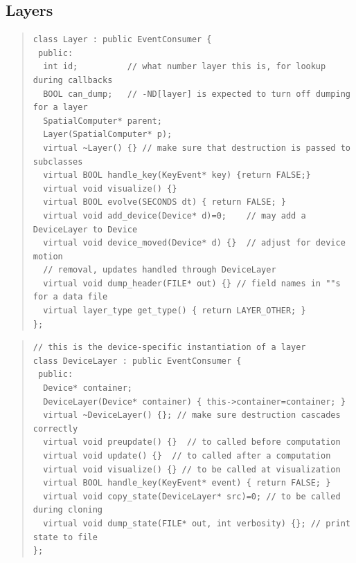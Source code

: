 \documentclass{article}
\begin{document}
\subsection{Layers}

\begin{quote}
\begin{verbatim}
class Layer : public EventConsumer {
 public:
  int id;          // what number layer this is, for lookup during callbacks                    
  BOOL can_dump;   // -ND[layer] is expected to turn off dumping for a layer                    
  SpatialComputer* parent;
  Layer(SpatialComputer* p);
  virtual ~Layer() {} // make sure that destruction is passed to subclasses                     
  virtual BOOL handle_key(KeyEvent* key) {return FALSE;}
  virtual void visualize() {}
  virtual BOOL evolve(SECONDS dt) { return FALSE; }
  virtual void add_device(Device* d)=0;    // may add a DeviceLayer to Device                   
  virtual void device_moved(Device* d) {}  // adjust for device motion                          
  // removal, updates handled through DeviceLayer                                               
  virtual void dump_header(FILE* out) {} // field names in ""s for a data file                  
  virtual layer_type get_type() { return LAYER_OTHER; }
};
\end{verbatim}
\end{quote}

\begin{quote}
\begin{verbatim}
// this is the device-specific instantiation of a layer
class DeviceLayer : public EventConsumer {
 public:
  Device* container;
  DeviceLayer(Device* container) { this->container=container; }
  virtual ~DeviceLayer() {}; // make sure destruction cascades correctly
  virtual void preupdate() {}  // to called before computation
  virtual void update() {}  // to called after a computation
  virtual void visualize() {} // to be called at visualization
  virtual BOOL handle_key(KeyEvent* event) { return FALSE; }
  virtual void copy_state(DeviceLayer* src)=0; // to be called during cloning
  virtual void dump_state(FILE* out, int verbosity) {}; // print state to file
};
\end{verbatim}
\end{quote}
\end{document}

